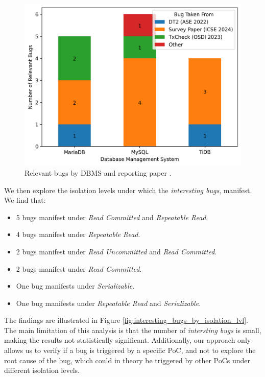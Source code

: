 \begin{figure}
    \centering
    \includegraphics[width=0.8\linewidth]{assets/bug_replication_interesting_bugs_by_dbms_and_paper.png}
    \caption{Relevant bugs by DBMS and reporting paper  \cite{cui2024understanding_ICSE2024, dou2023detecting_ICSE2023, cui2022differentially_ASE2022}.}
    \label{fig:interesting_bugs_by_paper}
\end{figure}


We then explore the isolation levels under which the \textit{interesting bugs}, manifest. We find that:
\begin{itemize}
\item 5 bugs manifest under \textit{Read Committed} and \textit{Repeatable Read}.
\item 4 bugs manifest under \textit{Repeatable Read}.
\item 2 bugs manifest under \textit{Read Uncommitted} and \textit{Read Committed}.
\item 2 bugs manifest under \textit{Read Committed}.
\item One bug manifests under \textit{Serializable}.
\item One bug manifests under \textit{Repeatable Read} and \textit{Serializable}.
\end{itemize}

The findings are illustrated in Figure \ref{fig:interesting_bugs_by_isolation_lvl}. The main limitation of this analysis is that the number of \textit{intersting bugs} is small, making the results not statistically significant. Additionally, our approach only allows us to verify if a bug is triggered by a specific PoC, and not to explore the root cause of the bug, which could in theory be triggered by other PoCs under different isolation levels.

